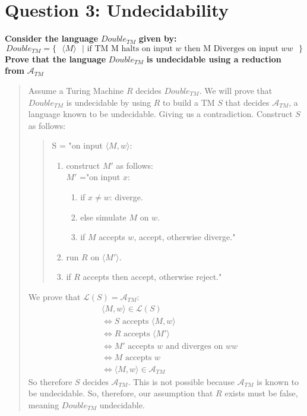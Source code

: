 \section*{Question 3: Undecidability}
    \textbf{Consider the language }$Double_{TM}$\textbf{ given by:}
    \begin{displaymath}
        Double_{TM} = \{ \text{ } \langle M \rangle \text{ } | \text{ if TM M halts on input }w\text{ then M Diverges on input }ww\text{ }\}
    \end{displaymath}
    \textbf{Prove that the language }$Double_{TM}$\textbf{ is undecidable using a reduction from }$\mathcal{A}_{TM}$
    \medskip
    \begin{quote}
        Assume a Turing Machine $R$ decides $Double_{TM}$. We will prove that $Double_{TM}$ is undecidable by using $R$ to build a TM $S$ that decides $\mathcal{A}_{TM}$, a language known to be undecidable. Giving us a contradiction. Construct $S$ as follows:
        \begin{quote}
            S = "on input $\langle M, w\rangle$:
                \begin{enumerate}
                    \item construct $M'$ as follows:\\
                        $M'$ ="on input $x$:
                        \begin{enumerate}
                            \item if $x\neq w$: diverge.
                            \item else simulate $M$ on $w$.
                            \item if $M$ accepts $w$, accept, otherwise diverge."
                        \end{enumerate}
                    \item run $R$ on $\langle M'\rangle$.
                    \item if $R$ accepts then accept, otherwise reject."
                \end{enumerate}
        \end{quote}
        \medskip
        We prove that $\mathcal{L}(S) = \mathcal{A}_{TM}$:
        \begin{align}
            &\langle M, w \rangle\in\mathcal{L}(S)
            \\&\Leftrightarrow S\text{ accepts }\langle M, w\rangle\
            \\&\Leftrightarrow R\text{ accepts }\langle M'\rangle\
            \\&\Leftrightarrow M'\text{ accepts }w\text{ and diverges on }ww
            \\&\Leftrightarrow M\text{ accepts }w
            \\&\Leftrightarrow\langle M, w\rangle\in\mathcal{A}_{TM}
        \end{align}
        \medskip
        So therefore $S$ decides $\mathcal{A}_{TM}$. This is not possible because $\mathcal{A}_{TM}$ is known to be undecidable. So, therefore, our assumption that $R$ exists must be false, meaning $Double_{TM}$ undecidable.
    \end{quote}